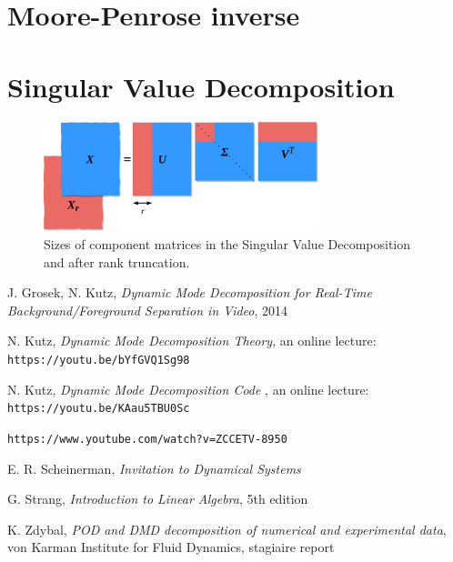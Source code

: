 \documentclass[10pt,twocolumn]{article}
\begin{document}
\section{Moore-Penrose inverse} \label{app:B}




\section{Singular Value Decomposition} \label{app:C}


\begin{figure}[H]
\centering\includegraphics[width=8cm]{svd.png}
\caption{Sizes of component matrices in the Singular Value Decomposition and after rank truncation.}
\label{fig:linear_system}
\end{figure}


\thebibliography{}

 J. Grosek, N. Kutz, \textit{Dynamic Mode Decomposition for Real-Time Background/Foreground Separation in Video}, 2014

 N. Kutz, \textit{Dynamic Mode Decomposition Theory}, an online lecture: \verb|https://youtu.be/bYfGVQ1Sg98| \label{bib:kutz_1}

 N. Kutz, \textit{Dynamic Mode Decomposition Code }, an online lecture: \verb|https://youtu.be/KAau5TBU0Sc| \label{bib:kutz_2}

 \verb|https://www.youtube.com/watch?v=ZCCETV-8950| \label{bib:andymation}

 E. R. Scheinerman, \textit{Invitation to Dynamical Systems}

 G. Strang, \textit{Introduction to Linear Algebra}, 5th edition

 K. Zdybal, \textit{POD and DMD decomposition of numerical and experimental data}, von Karman Institute for Fluid Dynamics, stagiaire report 
\end{document}
